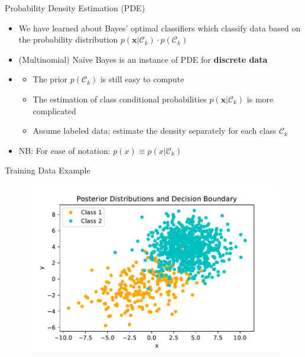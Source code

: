 \begin{frame}{Probability Density Estimation (PDE)}{}
	\begin{itemize}
		\item We have learned about Bayes' optimal classifiers which classify data based on the probability distribution
			$p(\bm{x} \vert \mathcal{C}_k) \cdot p(\mathcal{C}_k)$
		\item (Multinomial) Na\"{i}ve Bayes is an instance of PDE for \textbf{discrete data}
		\item {}
		\begin{itemize}
			\item The prior $p({\mathcal{C}_k})$ is still easy to compute
			\item The estimation of class conditional probabilities $p(\bm{x} \vert \mathcal{C}_k)$ is more complicated
			\item Assume labeled data; estimate the density separately for each class $\mathcal{C}_k$
		\end{itemize}
		\item NB: For ease of notation: $p(x) \equiv p(x \vert \mathcal{C}_k)$
	\end{itemize}
\end{frame}


\begin{frame}{Training Data Example}{}
	\begin{figure}
		\centering
		\includegraphics[scale=0.55]{04_density_estimation/02_img/pde_data_raw}
	\end{figure}
\end{frame}


